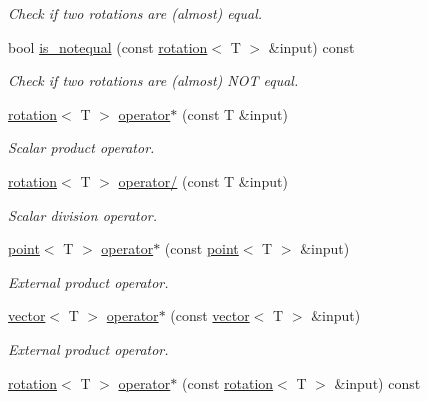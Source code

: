 \begin{DoxyCompactItemize}
\begin{DoxyCompactList}\small\item\em Check if two rotations are (almost) equal. \end{DoxyCompactList}\item 
bool \hyperlink{classddd_1_1rotation_aa1aba1ad41c7d09edce377bd5cb6efbb}{is\+\_\+notequal} (const \hyperlink{classddd_1_1rotation}{rotation}$<$ T $>$ \&input) const
\begin{DoxyCompactList}\small\item\em Check if two rotations are (almost) N\+OT equal. \end{DoxyCompactList}\item 
\hyperlink{classddd_1_1rotation}{rotation}$<$ T $>$ \hyperlink{classddd_1_1rotation_aada9691ca7067feefd0a0206f8c8d035}{operator$\ast$} (const T \&input)
\begin{DoxyCompactList}\small\item\em Scalar product operator. \end{DoxyCompactList}\item 
\hyperlink{classddd_1_1rotation}{rotation}$<$ T $>$ \hyperlink{classddd_1_1rotation_ac95799a9a25f9653d39ab3339b8085b7}{operator/} (const T \&input)
\begin{DoxyCompactList}\small\item\em Scalar division operator. \end{DoxyCompactList}\item 
\hyperlink{classddd_1_1point}{point}$<$ T $>$ \hyperlink{classddd_1_1rotation_a5761f38de833fde1a6c299ba1e1dc844}{operator$\ast$} (const \hyperlink{classddd_1_1point}{point}$<$ T $>$ \&input)
\begin{DoxyCompactList}\small\item\em External product operator. \end{DoxyCompactList}\item 
\hyperlink{classddd_1_1vector}{vector}$<$ T $>$ \hyperlink{classddd_1_1rotation_a1b55d8f810793caa469b12a2ca41ee6c}{operator$\ast$} (const \hyperlink{classddd_1_1vector}{vector}$<$ T $>$ \&input)
\begin{DoxyCompactList}\small\item\em External product operator. \end{DoxyCompactList}\item 
\hyperlink{classddd_1_1rotation}{rotation}$<$ T $>$ \hyperlink{classddd_1_1rotation_a974dff537d71eef1dd26420b9b4e087d}{operator$\ast$} (const \hyperlink{classddd_1_1rotation}{rotation}$<$ T $>$ \&input) const

\end{DoxyCompactItemize}
